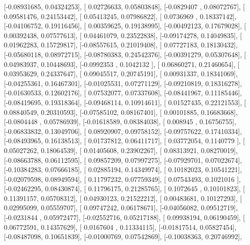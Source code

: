 \documentclass{article}
\begin{document}
       [-0.08931685,  0.04324253],
       [ 0.02726633,  0.05803848],
       [-0.0829407 ,  0.08072767],
       [ 0.09581476,  0.24153442],
       [ 0.05413245,  0.07986822],
       [ 0.0736969 ,  0.18337142],
       [-0.04106752,  0.19116456],
       [ 0.00359625,  0.19138995],
       [-0.00492123,  0.17679028],
       [ 0.00392438,  0.07577613],
       [ 0.04461079,  0.23522838],
       [-0.09174278,  0.14049835],
       [ 0.01962283,  0.15729817],
       [-0.08557615,  0.21019408],
       [ 0.07727183,  0.18130432],
       [-0.05680118,  0.08972715],
       [-0.08780383,  0.24542376],
       [-0.00391279,  0.05307648],
       [ 0.04983937,  0.10448693],
       [-0.0992353 ,  0.1042132 ],
       [ 0.06860271,  0.21460654],
       [ 0.03953629,  0.24337647],
       [ 0.09045517,  0.20745191],
       [ 0.00931337,  0.18341069],
       [-0.04255361,  0.16467301],
       [-0.01025531,  0.07271129],
       [-0.09210819,  0.18316278],
       [-0.01630533,  0.12602176],
       [ 0.07532077,  0.07337608],
       [-0.08441967,  0.11185446],
       [-0.08419695,  0.19318364],
       [-0.09468114,  0.10914611],
       [ 0.01527435,  0.22121553],
       [ 0.08840549,  0.20310593],
       [-0.07585102,  0.08167401],
       [ 0.00101885,  0.16683668],
       [-0.0804448 ,  0.05786939],
       [-0.01618589,  0.08384038],
       [ 0.008945  ,  0.16756755],
       [-0.06833832,  0.13049706],
       [ 0.08920907,  0.09758152],
       [-0.09757622,  0.17410334],
       [-0.08493965,  0.16138513],
       [ 0.01737812,  0.06411717],
       [ 0.03772054,  0.1140779 ],
       [ 0.05027262,  0.18064539],
       [ 0.01405608,  0.23902267],
       [ 0.08313921,  0.08270019],
       [-0.08663788,  0.06112595],
       [ 0.09857209,  0.07997275],
       [-0.07929701,  0.07022674],
       [-0.10384283,  0.07666185],
       [ 0.02885194,  0.14349974],
       [ 0.10182023,  0.10541221],
       [-0.02079598,  0.08949594],
       [ 0.11797232,  0.07759349],
       [ 0.07543493,  0.1021016 ],
       [-0.02462295,  0.08430874],
       [ 0.11796175,  0.21285765],
       [ 0.1072645 ,  0.10101823],
       [ 0.11391157,  0.05708312],
       [ 0.04930123,  0.21522212],
       [ 0.00483681,  0.10127293],
       [ 0.02995099,  0.05559707],
       [ 0.09747242,  0.06178671],
       [-0.04056082,  0.09512719],
       [-0.0231844 ,  0.05972477],
       [-0.02552716,  0.05217188],
       [ 0.09938194,  0.06190459],
       [ 0.06772591,  0.14357629],
       [ 0.0167604 ,  0.11334115],
       [-0.01817514,  0.05827454],
       [-0.08487098,  0.10651839],
       [-0.01000769,  0.07542869],
       [-0.10038363,  0.20746992],
\end{document}
